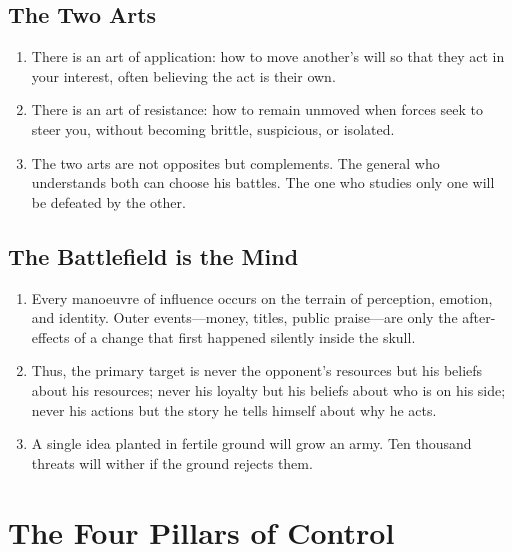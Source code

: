 \documentclass[12pt,a4paper,oneside]{book}
\begin{document}
\section{The Two Arts}
\begin{enumerate}[leftmargin=*, label=\arabic*.]
\item There is an art of application: how to move another's will so that they act in your interest, often believing the act is their own.
\item There is an art of resistance: how to remain unmoved when forces seek to steer you, without becoming brittle, suspicious, or isolated.
\item The two arts are not opposites but complements. The general who understands both can choose his battles. The one who studies only one will be defeated by the other.
\end{enumerate}

\section{The Battlefield is the Mind}
\begin{enumerate}[leftmargin=*, label=\arabic*.]
\item Every manoeuvre of influence occurs on the terrain of perception, emotion, and identity. Outer events—money, titles, public praise—are only the after-effects of a change that first happened silently inside the skull.
\item Thus, the primary target is never the opponent's resources but his beliefs about his resources; never his loyalty but his beliefs about who is on his side; never his actions but the story he tells himself about why he acts.
\item A single idea planted in fertile ground will grow an army. Ten thousand threats will wither if the ground rejects them.
\end{enumerate}

\chapter{The Four Pillars of Control}
\end{document}
